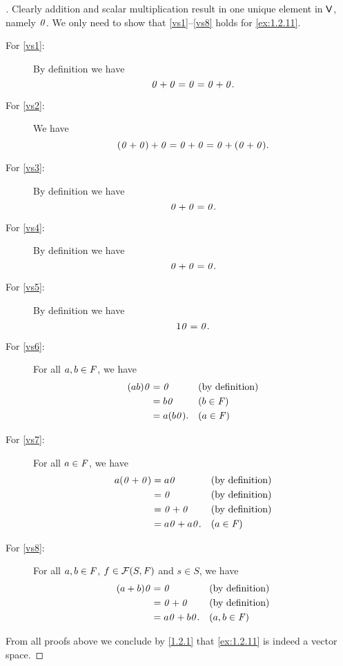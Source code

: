 \begin{proof}[]
	Clearly addition and scalar multiplication result in one unique element in \(\mathsf{V}\), namely \(\mathit{0}\).
	We only need to show that \ref{vs1}--\ref{vs8} holds for \cref{ex:1.2.11}.
	\begin{description}
		\item[For \ref{vs1}:]
			By definition we have
			\[
				\mathit{0} + \mathit{0} = \mathit{0} = \mathit{0} + \mathit{0}.
			\]
		\item[For \ref{vs2}:]
			We have
			\[
				(\mathit{0} + \mathit{0}) + \mathit{0} = \mathit{0} + \mathit{0} = \mathit{0} + (\mathit{0} + \mathit{0}).
			\]
		\item[For \ref{vs3}:]
			By definition we have
			\[
				\mathit{0} + \mathit{0} = \mathit{0}.
			\]
		\item[For \ref{vs4}:]
			By definition we have
			\[
				\mathit{0} + \mathit{0} = \mathit{0}.
			\]
		\item[For \ref{vs5}:]
			By definition we have
			\[
				1\mathit{0} = \mathit{0}.
			\]
		\item[For \ref{vs6}:]
			For all \(a, b \in \mathit{F}\), we have
			\begin{align*}
				(ab) \mathit{0} & = \mathit{0}      &  & \text{(by definition)} \\
				         & = b\mathit{0}     &  & (b \in \mathit{F})             \\
				         & = a(b\mathit{0}). &  & (a \in \mathit{F})
			\end{align*}
		\item[For \ref{vs7}:]
			For all \(a \in \mathit{F}\), we have
			\begin{align*}
				a(\mathit{0} + \mathit{0}) & = a\mathit{0}         &  & \text{(by definition)} \\
				             & = \mathit{0}          &  & \text{(by definition)} \\
				             & = \mathit{0} + \mathit{0}    &  & \text{(by definition)} \\
				             & = a\mathit{0} + a\mathit{0}. &  & (a \in \mathit{F})
			\end{align*}
		\item[For \ref{vs8}:]
			For all \(a, b \in \mathit{F}\), \(f \in \mathcal{F}(S, \mathit{F})\) and \(s \in S\), we have
			\begin{align*}
				(a + b) \mathit{0} & = \mathit{0}          &  & \text{(by definition)} \\
				            & = \mathit{0} + \mathit{0}    &  & \text{(by definition)} \\
				            & = a\mathit{0} + b\mathit{0}. &  & (a, b \in \mathit{F})
			\end{align*}
	\end{description}
	From all proofs above we conclude by \cref{1.2.1} that \cref{ex:1.2.11} is indeed a vector space.
\end{proof}

